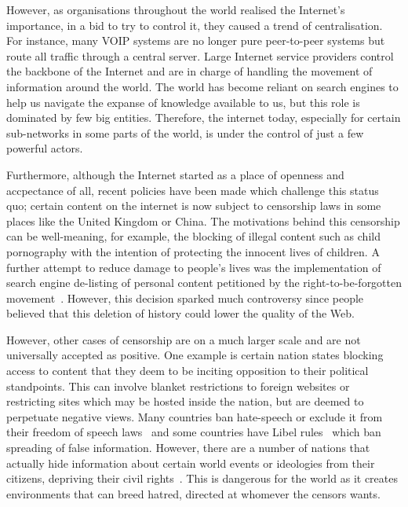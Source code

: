 \documentclass[ %
                    author={Samuel Russell},
                supervisor={Prof. Bogdan Warinschi},
                    degree={MEng},
                     title={Innocuous Ciphertexts},
                  subtitle={The DE-CENSOR Scheme},
                      type={research},
                      year={2018} ]{dissertation}
\begin{document}
However, as organisations throughout the world realised the Internet's importance, in a bid to try to control it, they caused a trend of centralisation.
For instance, many VOIP systems are no longer pure peer-to-peer systems but route all traffic through a central server.
Large Internet service providers control the backbone of the Internet and are in charge of handling the movement of information around the world.
The world has become reliant on search engines to help us navigate the expanse of knowledge available to us, but this role is dominated by few big entities.
Therefore, the internet today, especially for certain sub-networks in some parts of the world, is under the control of just a few powerful actors.

Furthermore, although the Internet started as a place of openness and accpectance of all, recent policies have been made which challenge this status quo; certain content on the internet is now subject to censorship laws in some places like the United Kingdom or China. The motivations behind this censorship can be well-meaning, for example, the blocking of illegal content such as child pornography with the intention of protecting the innocent lives of children. A further attempt to reduce damage to people's lives was the implementation of search engine de-listing of personal content petitioned by the right-to-be-forgotten movement~\cite{rtbf}. However, this decision sparked much controversy since people believed that this deletion of history could lower the quality of the Web.

However, other cases of censorship are on a much larger scale and are not universally accepted as positive. One example is certain nation states blocking access to content that they deem to be inciting opposition to their political standpoints. This can involve blanket restrictions to foreign websites or restricting sites which may be hosted inside the nation, but are deemed to perpetuate negative views. Many countries ban hate-speech or exclude it from their freedom of speech laws~\cite{hate} and some countries have Libel rules~\cite{libel} which ban spreading of false information. However, there are a number of nations that actually hide information about certain world events or ideologies from their citizens, depriving their civil rights~\cite{chincensor}. This is dangerous for the world as it creates environments that can breed hatred, directed at whomever the censors wants.
\end{document}
